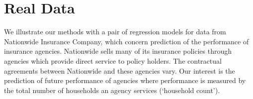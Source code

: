 \documentclass[ba]{imsart}
\newcommand{\by}{\mbox{\boldmath $y$}}
\begin{document}
\section{Real Data}
\label{Real Data}
We illustrate our methods with a pair of regression models for data from Nationwide Insurance Company, which concern prediction of the performance of insurance agencies.
%
Nationwide sells many of its insurance policies through agencies which provide direct service to policy holders.  
The contractual agreements between Nationwide and these agencies vary.  Our interest is the prediction of future performance of agencies where  performance is measured by the total number of households an agency services (`household count'). 
\end{document}
